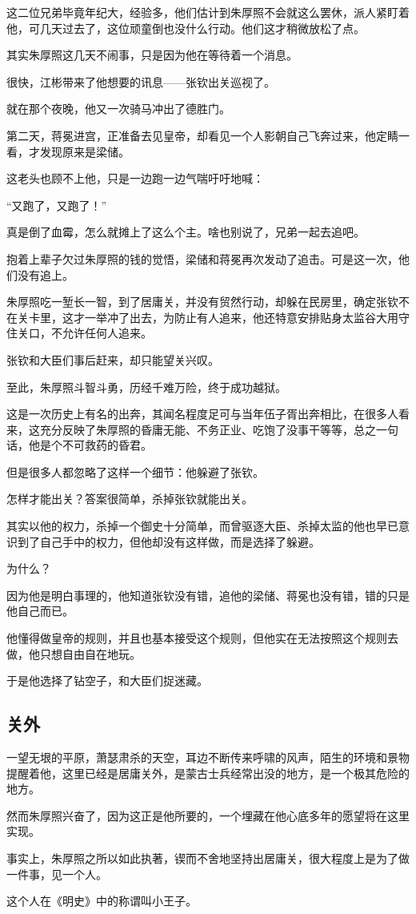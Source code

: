 \begin{multicols}{\theparacolNo}
		这二位兄弟毕竟年纪大，经验多，他们估计到朱厚照不会就这么罢休，派人紧盯着他，可几天过去了，这位顽童倒也没什么行动。他们这才稍微放松了点。

		其实朱厚照这几天不闹事，只是因为他在等待着一个消息。

		很快，江彬带来了他想要的讯息——张钦出关巡视了。

		就在那个夜晚，他又一次骑马冲出了德胜门。

		第二天，蒋冕进宫，正准备去见皇帝，却看见一个人影朝自己飞奔过来，他定睛一看，才发现原来是梁储。

		这老头也顾不上他，只是一边跑一边气喘吁吁地喊：

		“又跑了，又跑了！”

		真是倒了血霉，怎么就摊上了这么个主。啥也别说了，兄弟一起去追吧。

		抱着上辈子欠过朱厚照的钱的觉悟，梁储和蒋冕再次发动了追击。可是这一次，他们没有追上。

		朱厚照吃一堑长一智，到了居庸关，并没有贸然行动，却躲在民房里，确定张钦不在关卡里，这才一举冲了出去，为防止有人追来，他还特意安排贴身太监谷大用守住关口，不允许任何人追来。

		张钦和大臣们事后赶来，却只能望关兴叹。

		至此，朱厚照斗智斗勇，历经千难万险，终于成功越狱。

		这是一次历史上有名的出奔，其闻名程度足可与当年伍子胥出奔相比，在很多人看来，这充分反映了朱厚照的昏庸无能、不务正业、吃饱了没事干等等，总之一句话，他是个不可救药的昏君。

		但是很多人都忽略了这样一个细节：他躲避了张钦。

		怎样才能出关？答案很简单，杀掉张钦就能出关。

		其实以他的权力，杀掉一个御史十分简单，而曾驱逐大臣、杀掉太监的他也早已意识到了自己手中的权力，但他却没有这样做，而是选择了躲避。

		为什么？

		因为他是明白事理的，他知道张钦没有错，追他的梁储、蒋冕也没有错，错的只是他自己而已。

		他懂得做皇帝的规则，并且也基本接受这个规则，但他实在无法按照这个规则去做，他只想自由自在地玩。

		于是他选择了钻空子，和大臣们捉迷藏。

		\subsection{关外}
		一望无垠的平原，萧瑟肃杀的天空，耳边不断传来呼啸的风声，陌生的环境和景物提醒着他，这里已经是居庸关外，是蒙古士兵经常出没的地方，是一个极其危险的地方。

		然而朱厚照兴奋了，因为这正是他所要的，一个埋藏在他心底多年的愿望将在这里实现。

		事实上，朱厚照之所以如此执著，锲而不舍地坚持出居庸关，很大程度上是为了做一件事，见一个人。

		这个人在《明史》中的称谓叫小王子。
		\ifnum{}
	\end{multicols}
\fi
\newpage
